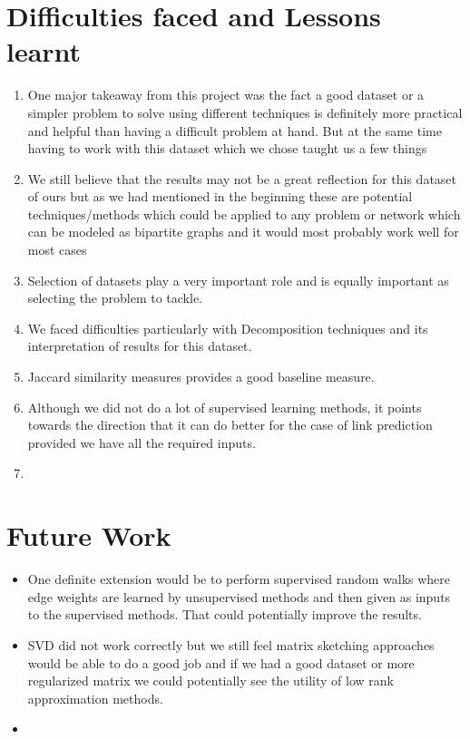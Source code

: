 \documentclass[letterpaper,twocolumn,11pt]{article}
\begin{document}
\section{ Difficulties faced and Lessons learnt}
\begin{enumerate}

\item One major takeaway from this project was the fact a good dataset or a simpler problem to solve using different techniques is definitely more practical and helpful than having a difficult problem at hand. But at the same time having to work with this dataset which we chose taught us a few things
\item We still believe that the results may not be a great reflection for this dataset of ours but as we had mentioned in the beginning these are potential techniques/methods which could be applied to any problem or network which can be modeled as bipartite graphs and it would most probably work well for most cases
\item Selection of datasets play a very important role and is equally important as selecting the problem to tackle.
\item We faced difficulties particularly with Decomposition techniques and its interpretation of results for this dataset.
\item  Jaccard similarity measures provides a good baseline measure.
\item Although we did not do a lot of supervised learning methods, it points towards the direction that it can do better for the case of link prediction provided we have all the required inputs.
\item  
\end{enumerate}


\section{Future Work}

\begin{itemize}
\item One definite extension would be to perform supervised random walks where edge weights are learned by unsupervised methods and then given as inputs to the supervised methods. That could potentially improve the results.
\item SVD did not work correctly but we still feel matrix sketching approaches would be able to do a good job and if we had a good dataset or more regularized matrix we could potentially see the utility of low rank approximation methods.
\item
\end{itemize}
\end{document}
